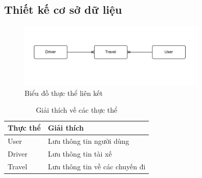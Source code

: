 \documentclass[../DoAn.tex]{subfiles}
\begin{document}
\subsection{Thiết kế cơ sở dữ liệu}
\begin{figure}[H]
    \centering
    \includegraphics[width=0.8\textwidth]{Hinhve/Bieu_do_thuc_the_lien_ket.png}
    \caption{Biểu đồ thực thể liên kết}
    \label{fig:Bieu_do_thuc_the_lien_ket}
\end{figure}

\begin{table}[H]
    \centering
    \begin{tabular}{|l|l|}
    \hline
    \textbf{Thực thể} & \textbf{Giải thích}            \\ \hline
    User              & Lưu thông tin người dùng       \\ \hline
    Driver            & Lưu thông tin tài xế           \\ \hline
    Travel            & Lưu thông tin về các chuyến đi \\ \hline
    \end{tabular}
    \caption{Giải thích về các thực thể}
    \label{table:Bieu_do_thuc_the_lien_ket}
\end{table}
\end{document}
